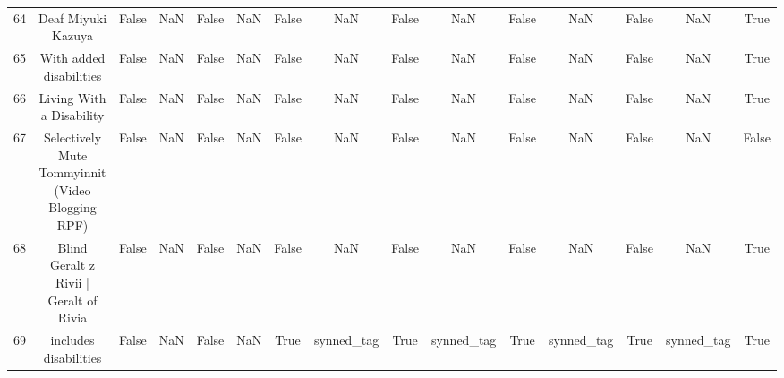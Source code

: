 \begin{table}[h!]
{\begin{tabular}{|c|c|c|c|c|c|c|c|c|c|c|c|c|c|c|}
         64 &                                Deaf Miyuki Kazuya &                          False &                       NaN &                          False &                       NaN &                          False &                       NaN &                          False &                       NaN &                          False &                       NaN &                          False &                       NaN &                           True \\
         65 &                           With added disabilities &                          False &                       NaN &                          False &                       NaN &                          False &                       NaN &                          False &                       NaN &                          False &                       NaN &                          False &                       NaN &                           True \\
         66 &                          Living With a Disability &                          False &                       NaN &                          False &                       NaN &                          False &                       NaN &                          False &                       NaN &                          False &                       NaN &                          False &                       NaN &                           True \\
         67 &  Selectively Mute Tommyinnit (Video Blogging RPF) &                          False &                       NaN &                          False &                       NaN &                          False &                       NaN &                          False &                       NaN &                          False &                       NaN &                          False &                       NaN &                          False \\
         68 &            Blind Geralt z Rivii | Geralt of Rivia &                          False &                       NaN &                          False &                       NaN &                          False &                       NaN &                          False &                       NaN &                          False &                       NaN &                          False &                       NaN &                           True \\
         69 &                             includes disabilities &                          False &                       NaN &                          False &                       NaN &                           True &                synned\_tag &                           True &                synned\_tag &                           True &                synned\_tag &                           True &                synned\_tag &                           True \\

\end{tabular}}
\end{table}
